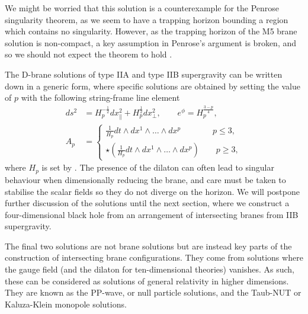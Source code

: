 We might be worried that this solution is a counterexample for the Penrose singularity theorem, as we seem to have a trapping horizon bounding a region which contains no singularity. However, as the trapping horizon of the M5 brane solution is non-compact, a key assumption in Penrose's argument is broken, and so we should not expect the theorem to hold \cite{Horowitz:2012nnc}.

The D-brane solutions of type IIA and type IIB supergravity can be written down in a generic form, where specific solutions are obtained by setting the value of $p$ with the following string-frame line element \cite{Mohaupt:2000gc}
\begin{equation}
\label{eq:gendbrane}
\begin{aligned}
	ds^2 &= H_p^{-\frac{1}{2}} dx^2_{\parallel} + H_p^{\frac{1}{2}} dx^2_\perp, \qquad e^{\phi} =  H_p^{\frac{3-p}{4}}, \\
	A_p &= \begin{cases}
		 \frac{1}{H_p} dt \wedge dx^1 \wedge \ldots \wedge dx^p \qquad \; \; \; \quad p \leq 3, \\
		\star \left( \frac{1}{H_p} dt \wedge dx^1 \wedge \ldots \wedge  dx^p \right) \qquad p \geq 3,
	\end{cases}
\end{aligned}
\end{equation}
where $H_p$ is set by . The presence of the dilaton can often lead to singular behaviour when dimensionally reducing the brane, and care must be taken to stabilise the scalar fields so they do not diverge on the horizon. We will postpone further discussion of the solutions until the next section, where we construct a four-dimensional black hole from an arrangement of intersecting branes from IIB supergravity.

The final two solutions are not brane solutions but are instead key parts of the construction of intersecting brane configurations. They come from solutions where the gauge field (and the dilaton for ten-dimensional theories) vanishes. As such, these can be considered as solutions of general relativity in higher dimensions. They are known as the PP-wave, or null particle solutions, and the Taub-NUT or Kaluza-Klein monopole solutions. 

